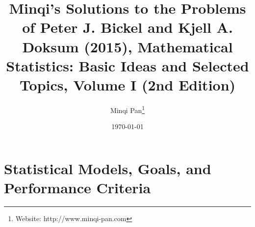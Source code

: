 \documentclass{amsbook}
\theoremstyle{definition}
\theoremstyle{remark}
\numberwithin{section}{chapter}
\numberwithin{equation}{chapter}
\begin{document}
\frontmatter

\title{Minqi's Solutions to the Problems of Peter J. Bickel and Kjell A. Doksum (2015), Mathematical Statistics: Basic Ideas and Selected Topics, Volume I (2nd Edition)}

\author{Minqi Pan\footnote{Website: http://www.minqi-pan.com}}

\date{\today}

\maketitle

\setcounter{page}{4}

\tableofcontents

\mainmatter

\chapter{Statistical Models, Goals, and Performance Criteria}
\end{document}
